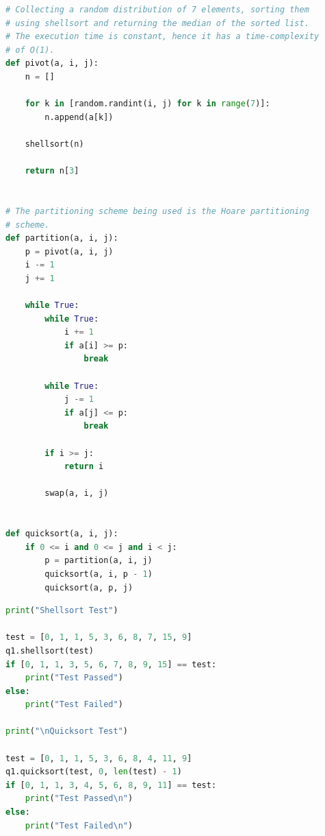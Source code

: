 \documentclass[12pt]{article}
\begin{document}
\begin{lstlisting}[caption={Quicksort implementation},language=Python]
# Collecting a random distribution of 7 elements, sorting them
# using shellsort and returning the median of the sorted list.
# The execution time is constant, hence it has a time-complexity
# of O(1).
def pivot(a, i, j):
    n = []

    for k in [random.randint(i, j) for k in range(7)]:
        n.append(a[k])

    shellsort(n)

    return n[3]


# The partitioning scheme being used is the Hoare partitioning
# scheme.
def partition(a, i, j):
    p = pivot(a, i, j)
    i -= 1
    j += 1

    while True:
        while True:
            i += 1
            if a[i] >= p:
                break

        while True:
            j -= 1
            if a[j] <= p:
                break

        if i >= j:
            return i

        swap(a, i, j)


def quicksort(a, i, j):
    if 0 <= i and 0 <= j and i < j:
        p = partition(a, i, j)
        quicksort(a, i, p - 1)
        quicksort(a, p, j)
\end{lstlisting}

\pagebreak

\begin{lstlisting}[caption={Test for \textit{Question 1} (1)},language=Python]
print("Shellsort Test")

test = [0, 1, 1, 5, 3, 6, 8, 7, 15, 9]
q1.shellsort(test)
if [0, 1, 1, 3, 5, 6, 7, 8, 9, 15] == test:
    print("Test Passed")
else:
    print("Test Failed")

print("\nQuicksort Test")

test = [0, 1, 1, 5, 3, 6, 8, 4, 11, 9]
q1.quicksort(test, 0, len(test) - 1)
if [0, 1, 1, 3, 4, 5, 6, 8, 9, 11] == test:
    print("Test Passed\n")
else:
    print("Test Failed\n")
\end{lstlisting}

\pagebreak
\end{document}
